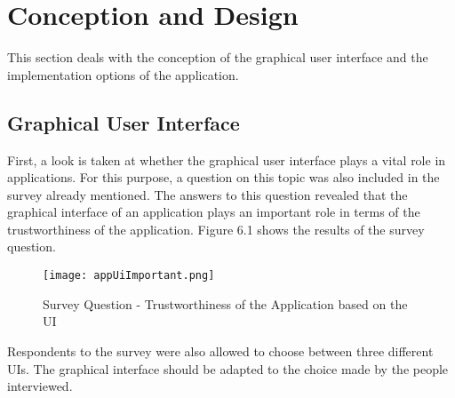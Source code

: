 

\chapter{Conception and Design}
This section deals with the conception of the graphical user interface and the implementation options of the application.
\section{Graphical User Interface}
First, a look is taken at whether the graphical user interface plays a vital role in applications. For this purpose, a question on this topic was also included in the survey already mentioned. The answers to this question revealed that the graphical interface of an application plays an important role in terms of the trustworthiness of the application. Figure 6.1 shows the results of the survey question.
\begin{figure}[H]
	\centering
	\texttt{[image: appUiImportant.png]}
	\caption[Survey Question]{Survey Question - Trustworthiness of the Application based on the UI}
\end{figure}
\noindent
Respondents to the survey were also allowed to choose between three different UIs. The graphical interface should be adapted to the choice made by the people interviewed.
